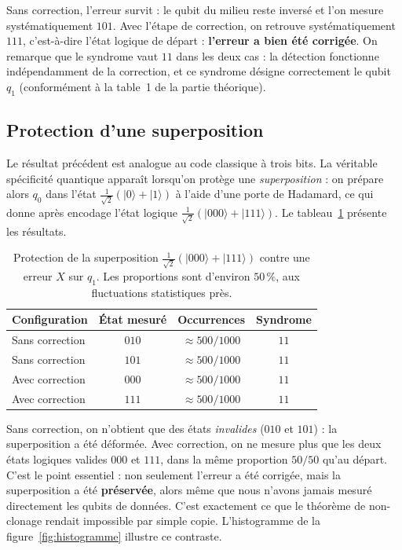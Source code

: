 \documentclass[a4paper,12pt]{article}
\begin{document}
Sans correction, l'erreur survit : le qubit du milieu reste inversé et l'on
mesure systématiquement $101$. Avec l'étape de correction, on retrouve
systématiquement $111$, c'est-à-dire l'état logique de départ : \textbf{l'erreur
a bien été corrigée}. On remarque que le syndrome vaut $11$ dans les deux cas :
la détection fonctionne indépendamment de la correction, et ce syndrome désigne
correctement le qubit $q_1$ (conformément à la table~1 de la partie théorique).

\subsection{Protection d'une superposition}

Le résultat précédent est analogue au code classique à trois bits. La véritable
spécificité quantique apparaît lorsqu'on protège une \emph{superposition} : on
prépare alors $q_0$ dans l'état $\frac{1}{\sqrt{2}}(|0\rangle + |1\rangle)$ à
l'aide d'une porte de Hadamard, ce qui donne après encodage l'état logique
$\frac{1}{\sqrt{2}}(|000\rangle + |111\rangle)$. Le
tableau~\ref{tab:superposition} présente les résultats.

\begin{table}[h]
    \centering
    \begin{tabular}{|l|c|c|c|}
        \hline
        \textbf{Configuration} & \textbf{État mesuré} & \textbf{Occurrences} & \textbf{Syndrome} \\
        \hline
        Sans correction & $010$ & $\approx 500 / 1000$ & $11$ \\
        Sans correction & $101$ & $\approx 500 / 1000$ & $11$ \\
        \hline
        Avec correction & $000$ & $\approx 500 / 1000$ & $11$ \\
        Avec correction & $111$ & $\approx 500 / 1000$ & $11$ \\
        \hline
    \end{tabular}
    \caption{Protection de la superposition
    $\frac{1}{\sqrt{2}}(|000\rangle + |111\rangle)$ contre une erreur $X$ sur
    $q_1$. Les proportions sont d'environ $50\,\%$, aux fluctuations statistiques
    près.}
    \label{tab:superposition}
\end{table}

Sans correction, on n'obtient que des états \emph{invalides} ($010$ et $101$) :
la superposition a été déformée. Avec correction, on ne mesure plus que les deux
états logiques valides $000$ et $111$, dans la même proportion $50/50$ qu'au
départ. C'est le point essentiel : non seulement l'erreur a été corrigée, mais
la superposition a été \textbf{préservée}, alors même que nous n'avons jamais
mesuré directement les qubits de données. C'est exactement ce que le théorème de
non-clonage rendait impossible par simple copie. L'histogramme de la
figure~\ref{fig:histogramme} illustre ce contraste.
\end{document}

